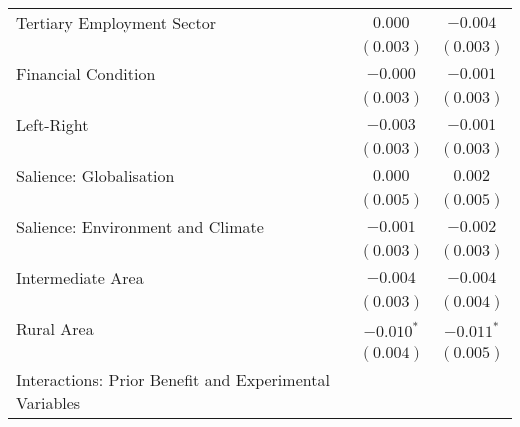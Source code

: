 \begin{center}
\begin{tiny}
\begin{longtable}{l@{} c@{} c@{}}
\quad Tertiary Employment Sector                                                                       & $0.000$         & $-0.004$         \\
                                                                                                       & $(0.003)$       & $(0.003)$        \\
\quad Financial Condition                                                                              & $-0.000$        & $-0.001$         \\
                                                                                                       & $(0.003)$       & $(0.003)$        \\
\quad Left-Right                                                                                       & $-0.003$        & $-0.001$         \\
                                                                                                       & $(0.003)$       & $(0.003)$        \\
\quad Salience: Globalisation                                                                          & $0.000$         & $0.002$          \\
                                                                                                       & $(0.005)$       & $(0.005)$        \\
\quad Salience: Environment and Climate                                                                & $-0.001$        & $-0.002$         \\
                                                                                                       & $(0.003)$       & $(0.003)$        \\
\quad Intermediate Area                                                                                & $-0.004$        & $-0.004$         \\
                                                                                                       & $(0.003)$       & $(0.004)$        \\
\quad Rural Area                                                                                       & $-0.010^{*}$    & $-0.011^{*}$     \\
                                                                                                       & $(0.004)$       & $(0.005)$        \\
Interactions: Prior Benefit and Experimental Variables                                                 &                 &                  \\

\end{longtable}
\end{tiny}
\end{center}
